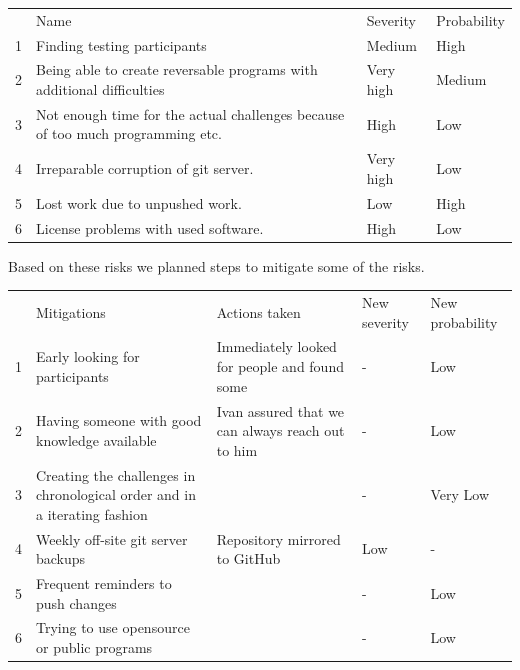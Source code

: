 \begin{table}[]
    \begin{tabular}{llll}
      & Name                                                                           & Severity  & Probability \\
    1 & Finding testing participants                                                   & Medium    & High        \\
    2 & Being able to create reversable programs with additional difficulties          & Very high & Medium      \\
    3 & Not enough time for the actual challenges because of too much programming etc. & High      & Low         \\
    4 & Irreparable corruption of git server.                                          & Very high & Low         \\
    5 & Lost work due to unpushed work.                                                & Low       & High        \\
    6 & License problems with used software.                                           & High      & Low        
    \end{tabular}
\end{table}

Based on these risks we planned steps to mitigate some of the risks.

\begin{table}[]
    \begin{tabular}{lllll}
      & Mitigations                                                               & Actions taken                                    & New severity & New probability \\
    1 & Early looking for participants                                            & Immediately looked for people and found some     & -            & Low             \\
    2 & Having someone with good knowledge available                              & Ivan assured that we can always reach out to him & -            & Low             \\
    3 & Creating the challenges in chronological order and in a iterating fashion &                                                  & -            & Very Low        \\
    4 & Weekly off-site git server backups                                        & Repository mirrored to GitHub                    & Low          & -               \\
    5 & Frequent reminders to push changes                                        &                                                  & -            & Low             \\
    6 & Trying to use opensource or public programs                               &                                                  & -            & Low            
    \end{tabular}
\end{table}

